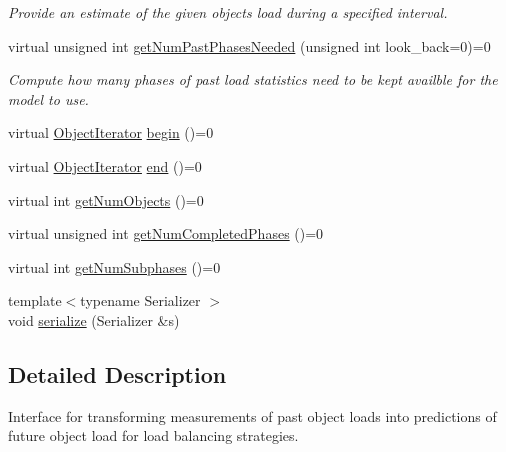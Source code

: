 \begin{DoxyCompactItemize}
\begin{DoxyCompactList}\small\item\em Provide an estimate of the given object\textquotesingle{}s load during a specified interval. \end{DoxyCompactList}\item 
virtual unsigned int \hyperlink{classvt_1_1vrt_1_1collection_1_1balance_1_1_load_model_ac061725720a2017908090863080b70e5}{get\+Num\+Past\+Phases\+Needed} (unsigned int look\+\_\+back=0)=0
\begin{DoxyCompactList}\small\item\em Compute how many phases of past load statistics need to be kept availble for the model to use. \end{DoxyCompactList}\item 
virtual \hyperlink{classvt_1_1vrt_1_1collection_1_1balance_1_1_object_iterator}{Object\+Iterator} \hyperlink{classvt_1_1vrt_1_1collection_1_1balance_1_1_load_model_a6ca139b4f14d79d1d59b46016efae221}{begin} ()=0
\item 
virtual \hyperlink{classvt_1_1vrt_1_1collection_1_1balance_1_1_object_iterator}{Object\+Iterator} \hyperlink{classvt_1_1vrt_1_1collection_1_1balance_1_1_load_model_a8474fb097bddbd75711e1e8d74084651}{end} ()=0
\item 
virtual int \hyperlink{classvt_1_1vrt_1_1collection_1_1balance_1_1_load_model_a87b90c2daf3a34243a7a2af266aa0b29}{get\+Num\+Objects} ()=0
\item 
virtual unsigned int \hyperlink{classvt_1_1vrt_1_1collection_1_1balance_1_1_load_model_a999b155237ce8ba253019e783462a9aa}{get\+Num\+Completed\+Phases} ()=0
\item 
virtual int \hyperlink{classvt_1_1vrt_1_1collection_1_1balance_1_1_load_model_ab46ea62e4228d4a64de9dd0adfe81af2}{get\+Num\+Subphases} ()=0
\item 
{\footnotesize template$<$typename Serializer $>$ }\\void \hyperlink{classvt_1_1vrt_1_1collection_1_1balance_1_1_load_model_a52e2210225947697a235b75c385eb104}{serialize} (Serializer \&s)
\end{DoxyCompactItemize}


\subsection{Detailed Description}
Interface for transforming measurements of past object loads into predictions of future object load for load balancing strategies. 

